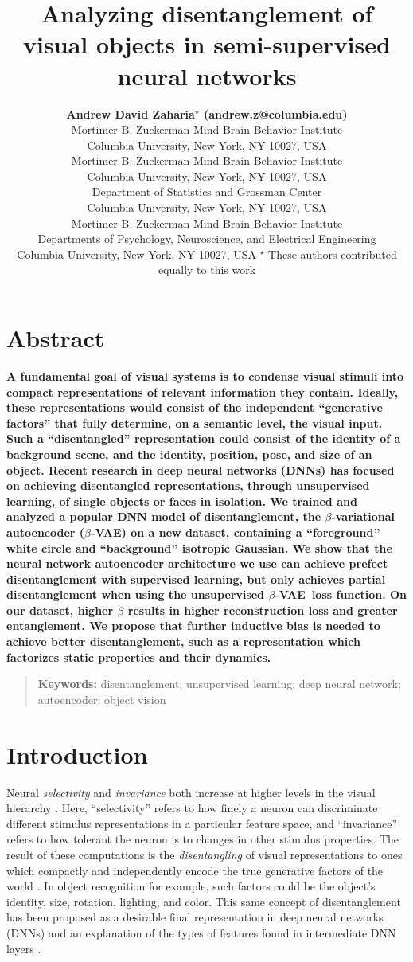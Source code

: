 \documentclass[10pt,letterpaper]{article}
\title{Analyzing disentanglement of visual objects in semi-supervised neural networks}
\author{{\large \bf Andrew David Zaharia$^\star$ (andrew.z@columbia.edu)} \\
  Mortimer B. Zuckerman Mind Brain Behavior Institute\\
  Columbia University, New York, NY 10027, USA
  \AND {\large \bf Benjamin Peters$^\star$ (benjamin.peters@columbia.edu)} \\
  Mortimer B. Zuckerman Mind Brain Behavior Institute\\
  Columbia University, New York, NY 10027, USA
  \AND {\large \bf John Cunningham (jpc2181@columbia.edu)} \\
  Department of Statistics and Grossman Center\\
  Columbia University, New York, NY 10027, USA
  \AND {\large \bf Nikolaus Kriegeskorte (n.kriegeskorte@columbia.edu)} \\
  Mortimer B. Zuckerman Mind Brain Behavior Institute\\ Departments of Psychology, Neuroscience, and Electrical Engineering\\
  Columbia University, New York, NY 10027, USA
  \AND $^\star$ These authors contributed equally to this work}
\newcommand{\bvae}{$\beta$-VAE~}
\begin{document}
\maketitle

\section{Abstract}
{
\bf
A fundamental goal of visual systems is to condense visual stimuli into compact representations of relevant information they contain. Ideally, these representations would consist of the independent ``generative factors'' that fully determine, on a semantic level, the visual input. Such a ``disentangled'' representation could consist of the identity of a background scene, and the identity, position, pose, and size of an object. Recent research in deep neural networks (DNNs) has focused on achieving disentangled representations, through unsupervised learning, of single objects or faces in isolation. We trained and analyzed a popular DNN model of disentanglement, the $\beta$-variational autoencoder ($\beta$-VAE) on a new dataset, containing a ``foreground'' white circle and ``background'' isotropic Gaussian. We show that the neural network autoencoder architecture we use can achieve prefect disentanglement with supervised learning, but only achieves partial disentanglement when using the unsupervised \bvae loss function. On our dataset, higher $\beta$ results in higher reconstruction loss and greater entanglement. We propose that further inductive bias is needed to achieve better disentanglement, such as a representation which factorizes static properties and their dynamics.
}
\begin{quote}
\small
\textbf{Keywords:} 
disentanglement; unsupervised learning; deep neural network; autoencoder; object vision
\end{quote}


\section{Introduction}

Neural \textit{selectivity} and \textit{invariance} both increase at higher levels in the visual hierarchy \cite{Rust2010}. Here, ``selectivity'' refers to how finely a neuron can discriminate different stimulus representations in a particular feature space, and ``invariance'' refers to how tolerant the neuron is to changes in other stimulus properties. The result of these computations is the \textit{disentangling} of visual representations to ones which compactly and independently encode the true generative factors of the world \cite{DiCarlo2007}. In object recognition for example, such factors could be the object's identity, size, rotation, lighting, and color. This same concept of disentanglement has been proposed as a desirable final representation in deep neural networks (DNNs) and an explanation of the types of features found in intermediate DNN layers \cite{Bengio2009}.
\end{document}

